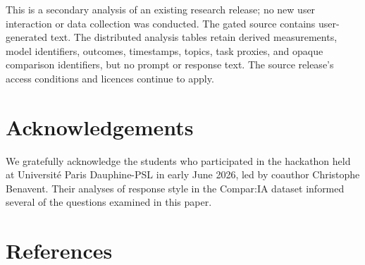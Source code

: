 \documentclass[
]{article}
\begin{document}
This is a secondary analysis of an existing research release; no new
user interaction or data collection was conducted. The gated source
contains user-generated text. The distributed analysis tables retain
derived measurements, model identifiers, outcomes, timestamps, topics,
task proxies, and opaque comparison identifiers, but no prompt or
response text. The source release's access conditions and licences
continue to apply.

\section*{Acknowledgements}\label{acknowledgements}

We gratefully acknowledge the students who participated in the hackathon
held at Université Paris Dauphine-PSL in early June 2026, led by
coauthor Christophe Benavent. Their analyses of response style in
the Compar:IA dataset informed several of the questions examined in this
paper.

\section*{References}\label{references}

\begingroup
\raggedright
\end{document}
